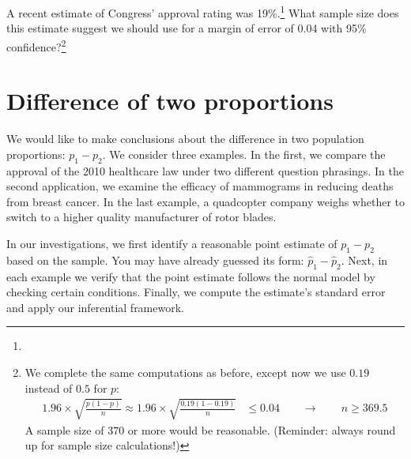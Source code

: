 
\begin{exercise}
A recent estimate of Congress' approval rating was 19\%.\footnote{} What sample size does this estimate suggest we should use for a margin of error of 0.04 with 95\% confidence?\footnote{We complete the same computations as before, except now we use $0.19$ instead of $0.5$ for $p$:
\begin{align*}
1.96\times \sqrt{\frac{p(1-p)}{n}} \approx
1.96\times \sqrt{\frac{0.19(1-0.19)}{n}} &\leq 0.04 \qquad\to\qquad n \geq 369.5
\end{align*}
A sample size of 370 or more would be reasonable. (Reminder: always round up for sample size calculations!)}


\end{exercise}






\section[Difference of two proportions]{Difference of two proportions ~}
\label{differenceOfTwoProportions}

We would like to make conclusions about the difference in two population proportions: \mbox{$p_1 - p_2$}. We consider three examples. In the first, we compare the approval of the 2010 healthcare law under two different question phrasings. In the second application, we examine the efficacy of mammograms in reducing deaths from breast cancer. In the last example, a quadcopter company weighs whether to switch to a higher quality manufacturer of rotor blades.

In our investigations, we first identify a reasonable point estimate of $p_1 - p_2$ based on the sample. You may have already guessed its form: $\hat{p}_1 - \hat{p}_2$. Next, in each example we verify that the point estimate follows the normal model by checking certain conditions. Finally, we compute the estimate's standard error and apply our inferential framework.


